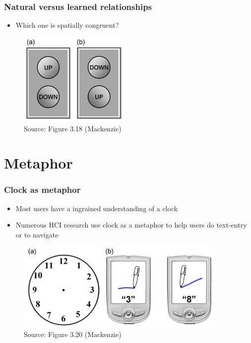 \documentclass{beamer}
\begin{document}
\begin{frame}
	\frametitle{Natural versus learned relationships}
	\begin{itemize}
		\item Which one is spatially congruent?
	\end{itemize}
	\begin{figure}
		\includegraphics[width=0.4\linewidth]{image/3-18}
		\caption{Source: Figure 3.18 (Mackenzie)}
	\end{figure}
\end{frame}

\section{Metaphor}

\begin{frame}
	\frametitle{Clock as metaphor}
	\begin{itemize}
		\item Most users have a ingrained understanding of a clock
		\item Numerous HCI research use clock as a metaphor to help users do text-entry or to navigate 
	\end{itemize}
	\begin{figure}
		\includegraphics[width=0.7\linewidth]{image/3-20}
		\caption{Source: Figure 3.20 (Mackenzie)}
	\end{figure}
\end{frame}
%
\end{document}
